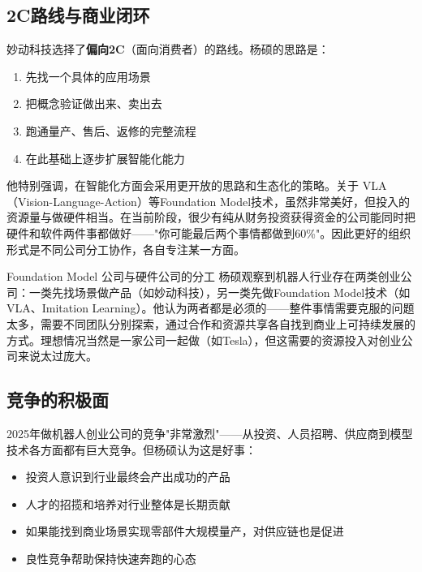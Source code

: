 \documentclass[a4paper]{article}
\begin{document}
\subsection{2C路线与商业闭环}

妙动科技选择了\textbf{偏向2C}（面向消费者）的路线。杨硕的思路是：

\begin{enumerate}
    \item 先找一个具体的应用场景
    \item 把概念验证做出来、卖出去
    \item 跑通量产、售后、返修的完整流程
    \item 在此基础上逐步扩展智能化能力
\end{enumerate}

他特别强调，在智能化方面会采用更开放的思路和生态化的策略。关于 VLA（Vision-Language-Action）等Foundation Model技术，虽然非常美好，但投入的资源量与做硬件相当。在当前阶段，很少有纯从财务投资获得资金的公司能同时把硬件和软件两件事都做好——"你可能最后两个事情都做到60\%"。因此更好的组织形式是不同公司分工协作，各自专注某一方面。

\begin{knowledgebox}{Foundation Model 公司与硬件公司的分工}
杨硕观察到机器人行业存在两类创业公司：一类先找场景做产品（如妙动科技），另一类先做Foundation Model技术（如VLA、Imitation Learning）。他认为两者都是必须的——整件事情需要克服的问题太多，需要不同团队分别探索，通过合作和资源共享各自找到商业上可持续发展的方式。理想情况当然是一家公司一起做（如Tesla），但这需要的资源投入对创业公司来说太过庞大。
\end{knowledgebox}

\subsection{竞争的积极面}

2025年做机器人创业公司的竞争"非常激烈"——从投资、人员招聘、供应商到模型技术各方面都有巨大竞争。但杨硕认为这是好事：

\begin{itemize}
    \item 投资人意识到行业最终会产出成功的产品
    \item 人才的招揽和培养对行业整体是长期贡献
    \item 如果能找到商业场景实现零部件大规模量产，对供应链也是促进
    \item 良性竞争帮助保持快速奔跑的心态
\end{itemize}
\end{document}
